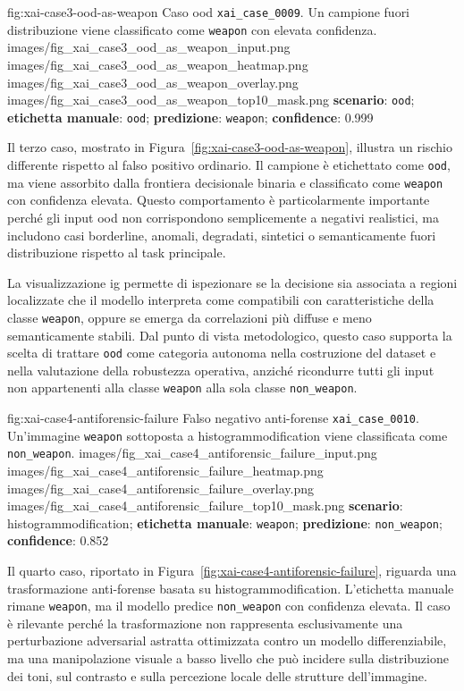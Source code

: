 \XAIcaseFigureMaskGrid
{fig:xai-case3-ood-as-weapon}
{Caso \gls{ood} \texttt{xai\_case\_0009}. Un campione fuori distribuzione viene
classificato come \texttt{weapon} con elevata confidenza.}
{images/fig_xai_case3_ood_as_weapon_input.png}
{images/fig_xai_case3_ood_as_weapon_heatmap.png}
{images/fig_xai_case3_ood_as_weapon_overlay.png}
{images/fig_xai_case3_ood_as_weapon_top10_mask.png}
{\textbf{scenario}: \texttt{ood};
 \textbf{etichetta manuale}: \texttt{ood};
 \textbf{predizione}: \texttt{weapon};
 \textbf{confidence}: 0.999}

Il terzo caso, mostrato in Figura~\ref{fig:xai-case3-ood-as-weapon}, illustra
un rischio differente rispetto al falso positivo ordinario. Il campione è
etichettato come \texttt{ood}, ma viene assorbito dalla frontiera decisionale
binaria e classificato come \texttt{weapon} con confidenza elevata. Questo
comportamento è particolarmente importante perché gli input \gls{ood} non
corrispondono semplicemente a negativi realistici, ma includono casi borderline,
anomali, degradati, sintetici o semanticamente fuori distribuzione rispetto al
task principale.

La visualizzazione \gls{ig} permette di ispezionare se la decisione sia associata
a regioni localizzate che il modello interpreta come compatibili con
caratteristiche della classe \texttt{weapon}, oppure se emerga da correlazioni
più diffuse e meno semanticamente stabili. Dal punto di vista metodologico,
questo caso supporta la scelta di trattare \texttt{ood} come categoria autonoma
nella costruzione del dataset e nella valutazione della robustezza operativa,
anziché ricondurre tutti gli input non appartenenti alla classe \texttt{weapon}
alla sola classe \texttt{non\_weapon}.

\XAIcaseFigureMaskGrid
{fig:xai-case4-antiforensic-failure}
{Falso negativo anti-forense \texttt{xai\_case\_0010}. Un'immagine
\texttt{weapon} sottoposta a \gls{histogrammodification} viene classificata come
\texttt{non\_weapon}.}
{images/fig_xai_case4_antiforensic_failure_input.png}
{images/fig_xai_case4_antiforensic_failure_heatmap.png}
{images/fig_xai_case4_antiforensic_failure_overlay.png}
{images/fig_xai_case4_antiforensic_failure_top10_mask.png}
{\textbf{scenario}: \gls{histogrammodification};
 \textbf{etichetta manuale}: \texttt{weapon};
 \textbf{predizione}: \texttt{non\_weapon};
 \textbf{confidence}: 0.852}

Il quarto caso, riportato in Figura~\ref{fig:xai-case4-antiforensic-failure},
riguarda una trasformazione anti-forense basata su
\gls{histogrammodification}. L'etichetta manuale rimane \texttt{weapon}, ma
il modello predice \texttt{non\_weapon} con confidenza elevata. Il caso è
rilevante perché la trasformazione non rappresenta esclusivamente una
perturbazione adversarial astratta ottimizzata contro un modello differenziabile,
ma una manipolazione visuale a basso livello che può incidere sulla distribuzione
dei toni, sul contrasto e sulla percezione locale delle strutture dell'immagine.

